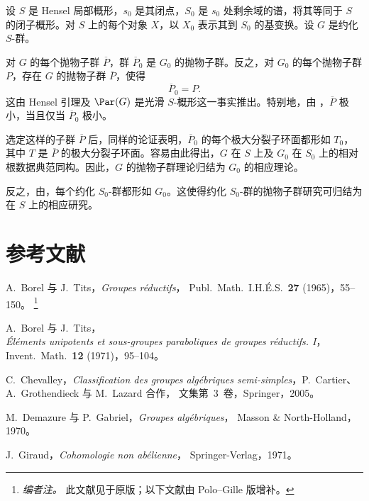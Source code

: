 
设 \(S\) 是 Hensel 局部概形，\(s_0\) 是其闭点，\(S_0\) 是 \(s_0\) 处剩余域的谱，将其等同于 \(S\) 的闭子概形。对 \(S\) 上的每个对象 \(X\)，以 \(X_0\) 表示其到 \(S_0\) 的基变换。设 \(G\) 是约化 \(S\)-群。

对 \(G\) 的每个抛物子群 \(\overline P\)，群 \(\overline P_0\) 是 \(G_0\) 的抛物子群。反之，对 \(G_0\) 的每个抛物子群 \(P\)，存在 \(G\) 的抛物子群 \(\overline P\)，使得
\[
 \overline P_0=P.
\]
这由 Hensel 引理及 \(\Par(G)\) 是光滑 \(S\)-概形这一事实推出。特别地，由 ，\(\overline P\) 极小，当且仅当 \(\overline P_0\) 极小。

选定这样的子群 \(\overline P\) 后，同样的论证表明，\(\overline P_0\) 的每个极大分裂子环面都形如 \(T_0\)，其中 \(T\) 是 \(\overline P\) 的极大分裂子环面。容易由此得出，\(G\) 在 \(S\) 上及 \(G_0\) 在 \(S_0\) 上的相对根数据典范同构。因此，\(G\) 的抛物子群理论归结为 \(G_0\) 的相应理论。

反之，由，每个约化 \(S_0\)-群都形如 \(G_0\)。这使得约化 \(S_0\)-群的抛物子群研究可归结为在 \(S\) 上的相应研究。

\chapter*{参考文献}

\begin{description}[leftmargin=4.5em,style=nextline]
\item[\textup{[BT65]}]
A.~Borel 与 J.~Tits，\emph{Groupes réductifs}，
Publ.\ Math.\ I.H.É.S.\ \textbf{27} \textup{(1965)}，55--150。
\footnote{\emph{编者注。} 此文献见于原版；以下文献由 Polo--Gille 版增补。}

\item[\textup{[BT71]}]
A.~Borel 与 J.~Tits，\\
\emph{Éléments unipotents et sous-groupes
paraboliques de groupes réductifs. I}，
Invent.\ Math.\ \textbf{12} \textup{(1971)}，95--104。

\item[\textup{[Ch05]}]
C.~Chevalley，\emph{Classification des groupes algébriques
semi-simples}，P.~Cartier、A.~Grothendieck 与 M.~Lazard 合作，
文集第~3~卷，Springer，2005。

\item[\textup{[DG70]}]
M.~Demazure 与 P.~Gabriel，\emph{Groupes algébriques}，
Masson \& North-Holland，1970。

\item[\textup{[Gi71]}]
J.~Giraud，\emph{Cohomologie non abélienne}，
Springer-Verlag，1971。
\end{description}

